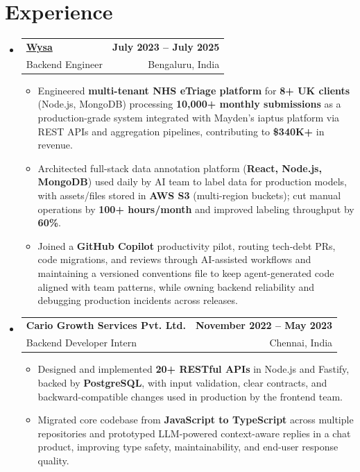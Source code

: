\documentclass[letterpaper,10pt]{article}
\makeatletter
\newcommand{\resumeItem}[1]{
  \item\small{#1\vspace{-1pt}}
}
\newcommand{\resumeSubheading}[4]{
  \vspace{1pt}\item
    \begin{tabular*}{0.985\textwidth}[t]{l@{\extracolsep{\fill}}r}
      \textbf{#1} & \textbf{\small #2} \\
      {\small\color{ResumeSlate} #3} & {\small\color{ResumeSlate} #4} \\
    \end{tabular*}\vspace{-6pt}
}
\newcommand{\resumeSubHeadingListStart}{\begin{itemize}[leftmargin=0.0in, label={}, itemsep=2pt, topsep=2pt]}
\newcommand{\resumeSubHeadingListEnd}{\end{itemize}}
\newcommand{\resumeItemListStart}{\begin{itemize}[leftmargin=0.18in, itemsep=2pt, topsep=1pt]}
\newcommand{\resumeItemListEnd}{\end{itemize}\vspace{-4pt}}
\makeatother
\begin{document}
\section{Experience}
\resumeSubHeadingListStart
  \resumeSubheading
    {\href{https://www.wysa.io}{Wysa}}{July 2023 -- July 2025}
    {Backend Engineer}{Bengaluru, India}
    \resumeItemListStart
      \resumeItem{Engineered \textbf{multi-tenant NHS eTriage platform} for \textbf{8+ UK clients} (Node.js, MongoDB) processing \textbf{10{,}000+ monthly submissions} as a production-grade system integrated with Mayden's iaptus platform via REST APIs and aggregation pipelines, contributing to \textbf{\$340K+} in revenue.}
      \resumeItem{Architected full-stack data annotation platform (\textbf{React, Node.js, MongoDB}) used daily by AI team to label data for production models, with assets/files stored in \textbf{AWS S3} (multi-region buckets); cut manual operations by \textbf{100+ hours/month} and improved labeling throughput by \textbf{60\%}.}
      \resumeItem{Joined a \textbf{GitHub Copilot} productivity pilot, routing tech-debt PRs, code migrations, and reviews through AI-assisted workflows and maintaining a versioned conventions file to keep agent-generated code aligned with team patterns, while owning backend reliability and debugging production incidents across releases.}
    \resumeItemListEnd
  \resumeSubheading
    {Cario Growth Services Pvt. Ltd.}{November 2022 -- May 2023}
    {Backend Developer Intern}{Chennai, India}
    \resumeItemListStart
      \resumeItem{Designed and implemented \textbf{20+ RESTful APIs} in Node.js and Fastify, backed by \textbf{PostgreSQL}, with input validation, clear contracts, and backward-compatible changes used in production by the frontend team.}
      \resumeItem{Migrated core codebase from \textbf{JavaScript to TypeScript} across multiple repositories and prototyped LLM-powered context-aware replies in a chat product, improving type safety, maintainability, and end-user response quality.}
    \resumeItemListEnd
\resumeSubHeadingListEnd
\vspace{-4pt}
\end{document}
